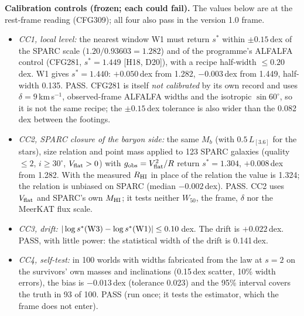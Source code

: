 \documentclass[10pt]{article}
\begin{document}
\textbf{Calibration controls (frozen; each could fail).} The values below are at the rest-frame reading (CFG309); all four also pass in the version 1.0 frame.
\begin{itemize}
\item \emph{CC1, local level:} the nearest window W1 must return $s^*$ within $\pm0.15$\,dex of the SPARC scale ($1.20/0.93603=1.282$) and of the programme's ALFALFA control (CFG281, $s^*=1.449$ [H18, D20]), with a recipe half-width $\le0.20$\,dex. W1 gives $s^*=1.440$: $+0.050$\,dex from 1.282, $-0.003$\,dex from 1.449, half-width 0.135. PASS. CFG281 is itself \emph{not calibrated} by its own record and uses $\delta=9$\,km\,s$^{-1}$, observed-frame ALFALFA widths and the isotropic $\sin60^\circ$, so it is not the same recipe; the $\pm0.15$\,dex tolerance is also wider than the 0.082\,dex between the footings.
\item \emph{CC2, SPARC closure of the baryon side:} the same $M_b$ (with $0.5\,L_{[3.6]}$ for the stars), size relation and point mass applied to 123 SPARC galaxies (quality $\le2$, $i\ge30^\circ$, $V_{\rm flat}>0$) with $g_{\rm obs}=V_{\rm flat}^2/R$ return $s^*=1.304$, $+0.008$\,dex from 1.282. With the measured $R_{\rm HI}$ in place of the relation the value is 1.324; the relation is unbiased on SPARC (median $-0.002$\,dex). PASS. CC2 uses $V_{\rm flat}$ and SPARC's own $M_{\rm HI}$; it tests neither $W_{50}$, the frame, $\delta$ nor the MeerKAT flux scale.
\item \emph{CC3, drift:} $|\log s^*({\rm W3})-\log s^*({\rm W1})|\le0.10$\,dex. The drift is $+0.022$\,dex. PASS, with little power: the statistical width of the drift is 0.141\,dex.
\item \emph{CC4, self-test:} in 100 worlds with widths fabricated from the law at $s=2$ on the survivors' own masses and inclinations (0.15\,dex scatter, 10\% width errors), the bias is $-0.013$\,dex (tolerance 0.023) and the 95\% interval covers the truth in 93 of 100. PASS (run once; it tests the estimator, which the frame does not enter).
\end{itemize}
\end{document}
